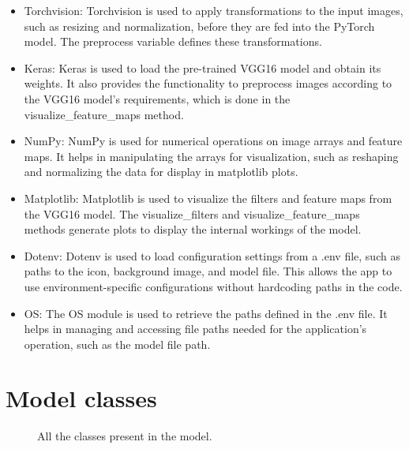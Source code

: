 \documentclass[a4paper,oneside,11pt]{book}
\begin{document}
\begin{itemize}
    \item Torchvision: Torchvision is used to apply transformations to the input images, such as resizing and normalization, before they are fed into the PyTorch model. The preprocess variable defines these transformations.
    \item Keras: Keras is used to load the pre-trained VGG16 model and obtain its weights. It also provides the functionality to preprocess images according to the VGG16 model's requirements, which is done in the visualize\_feature\_maps method.
    \item NumPy: NumPy is used for numerical operations on image arrays and feature maps. It helps in manipulating the arrays for visualization, such as reshaping and normalizing the data for display in matplotlib plots.
    \item Matplotlib: Matplotlib is used to visualize the filters and feature maps from the VGG16 model. The visualize\_filters and visualize\_feature\_maps methods generate plots to display the internal workings of the model.
    \item Dotenv: Dotenv is used to load configuration settings from a .env file, such as paths to the icon, background image, and model file. This allows the app to use environment-specific configurations without hardcoding paths in the code.
    \item OS: The OS module is used to retrieve the paths defined in the .env file. It helps in managing and accessing file paths needed for the application's operation, such as the model file path.
\end{itemize}
\section{Model classes}
\begin{figure}[H]
    \centering
    \caption{All the classes present in the model.}
\end{figure}
\end{document}
